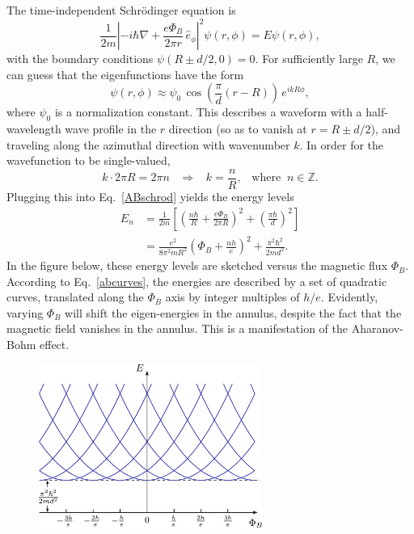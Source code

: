 \documentclass[pra,12pt]{revtex4}
\begin{document}
The time-independent Schr\"odinger equation is
\begin{equation}
  \frac{1}{2m}\left|-i\hbar\nabla+
  \frac{e\Phi_B}{2\pi r} \, \hat{e}_\phi\right|^2 \psi(r,\phi)
  = E\psi(r,\phi),
  \label{ABschrod}
\end{equation}
with the boundary conditions $\psi(R\pm d/2,0) = 0$.  For sufficiently
large $R$, we can guess that the eigenfunctions have the form
\begin{equation}
  \psi(r,\phi) \approx
  \psi_0 \, \cos\left(\frac{\pi}{d}(r-R)\right)\, e^{i k R \phi},
\end{equation}
where $\psi_0$ is a normalization constant.  This describes a waveform
with a half-wavelength wave profile in the $r$ direction (so as to
vanish at $r = R \pm d/2$), and traveling along the azimuthal
direction with wavenumber $k$.  In order for the wavefunction to be
single-valued,
\begin{equation}
  k \cdot 2\pi R = 2\pi n \;\;\;\Rightarrow \;\;\; k = \frac{n}{R},
  \;\;\;\mathrm{where}\;\; n \in \mathbb{Z}.
\end{equation}
Plugging this into Eq.~\eqref{ABschrod} yields the energy levels
\begin{align}
  E_n &= \frac{1}{2m} \left[
    \left(\frac{n\hbar}{R} + \frac{e\Phi_B}{2\pi R}\right)^2
    + \left(\frac{\pi\hbar}{d}\right)^2 \right] \\
  &= \frac{e^2}{8\pi^2mR^2} \left(\Phi_B + \frac{nh}{e} \right)^2
  + \frac{\pi^2\hbar^2}{2md^2}.
  \label{abcurves}
\end{align}
In the figure below, these energy levels are sketched versus the
magnetic flux $\Phi_B$.  According to Eq.~\eqref{abcurves}, the
energies are described by a set of quadratic curves, translated along
the $\Phi_B$ axis by integer multiples of $h/e$.  Evidently, varying
$\Phi_B$ will shift the eigen-energies in the annulus, despite the
fact that the magnetic field vanishes in the annulus.  This is a
manifestation of the Aharanov-Bohm effect.

\begin{figure}[h]
  \centering\includegraphics[width=0.65\textwidth]{abring}
\end{figure}
\end{document}
